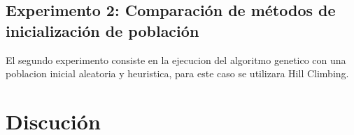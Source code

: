 \documentclass[12pt]{article}
\begin{document}
		\subsection[Experimento 2]{Experimento 2: Comparación de métodos de inicialización de población}
			El segundo experimento consiste en la ejecucion del algoritmo genetico con una poblacion inicial aleatoria y heuristica, para este caso se utilizara Hill Climbing.

	\section{Discución}





	\renewcommand{\contentsname}{Índice}  %
	\tableofcontents
	\setcounter{tocdepth}{3} 
\end{document}
